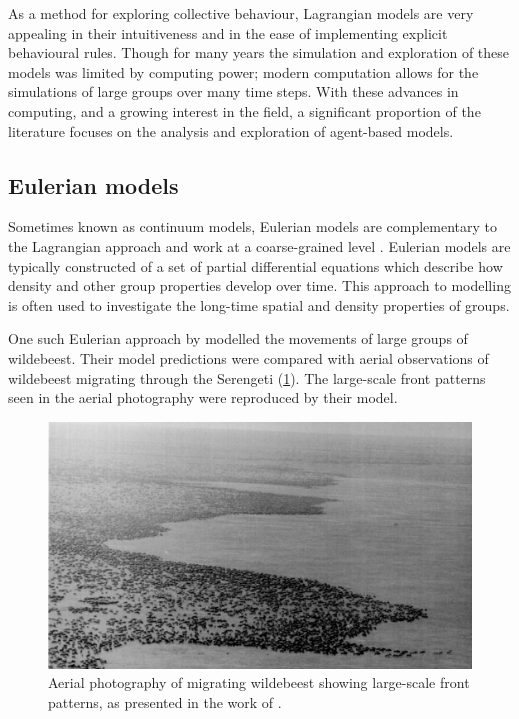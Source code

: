 As a method for exploring collective behaviour, Lagrangian models are very
appealing in their intuitiveness and in the ease of implementing explicit
behavioural rules. Though for many years the simulation and exploration of
these models was limited by computing power; modern computation allows for the
simulations of large groups over many time steps. With these advances in
computing, and a growing interest in the field, a significant proportion of the
literature focuses on the analysis and exploration of agent-based models.

\subsection{Eulerian models}
\label{ssec:eulerian_models}

Sometimes known as continuum models, Eulerian models are complementary to the
Lagrangian approach and work at a coarse-grained level \parencite{giardina08}.
Eulerian models are typically constructed of a set of partial differential
equations which describe how density and other group properties develop over
time. This approach to modelling is often used to investigate the long-time
spatial and density properties of groups.

One such Eulerian approach by \textcite{gueron93} modelled the movements of
large groups of wildebeest. Their model predictions were compared with aerial
observations of wildebeest migrating through the Serengeti
(\cref{fig:wildebeest}). The large-scale front patterns seen in the aerial
photography were reproduced by their model.

\begin{figure}[tb]
  \includegraphics[width=\textwidth]{wildebeest.png}
  \caption{Aerial photography of migrating wildebeest showing large-scale
    front patterns, as presented in the work of \textcite{gueron93}.}
  \label{fig:wildebeest}
\end{figure}

